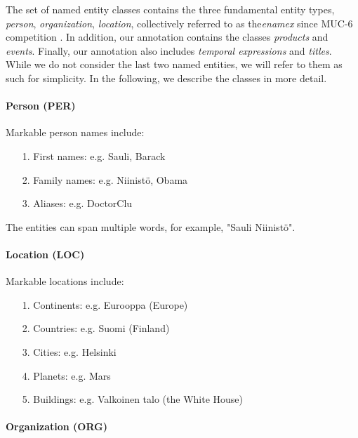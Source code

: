 \documentclass[11pt]{article}
\begin{document}
The set of named entity classes contains the three fundamental entity types, \textit{person}, \textit{organization}, \textit{location}, collectively referred to as the\textit{enamex} since MUC-6 competition \citep{grishman1996}. %
In addition, our annotation contains the classes \textit{products} and \textit{events}. Finally, our annotation also includes \textit{temporal expressions} and \textit{titles}. While we do not consider the last two named entities, we will refer to them as such for simplicity. In the following, we describe the classes in more detail.

\paragraph{Person (PER)}

Markable person names include:

\begin{itemize}

\item[1.] First names: e.g. Sauli, Barack
\item[2.] Family names: e.g. Niinist\"o, Obama
\item[3.] Aliases: e.g. DoctorClu

\end{itemize}

The entities can span multiple words, for example, "Sauli Niinist\"o". 


\paragraph{Location (LOC)}

Markable locations include:

\begin{itemize}

\item[1.] Continents: e.g. Eurooppa (Europe)
\item[2.] Countries: e.g. Suomi (Finland)
\item[3.] Cities: e.g. Helsinki
\item[4.] Planets: e.g. Mars
\item[5.] Buildings: e.g. Valkoinen talo (the White House)



\end{itemize}


\paragraph{Organization (ORG)}
\end{document}
